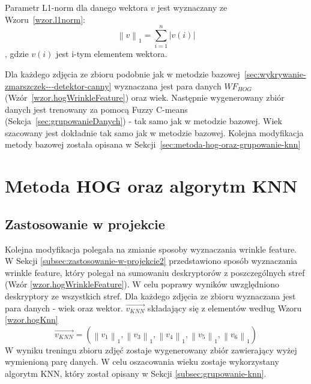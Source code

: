 \documentclass[a4paper,twoside,12pt]{book}
\begin{document}
    Parametr L1-norm dla danego wektora $v$ jest wyznaczany ze Wzoru~\ref{wzor.l1norm}:
    \large
    \begin{equation}
        \left \|v  \right \|_{1} = \sum_{i=1}^{n}\left |v(i)  \right |
        \label{wzor.l1norm}
    \end{equation}
    \normalsize
    , gdzie $v(i)$ jest i-tym elementem wektora.

    Dla każdego zdjęcia ze zbioru podobnie jak w metodzie bazowej~\ref{sec:wykrywanie-zmarszczek---detektor-canny}
    wyznaczana jest para danych $WF_{HOG}$ (Wzór~\ref{wzor.hogWrinkleFeature}) oraz wiek. Następnie wygenerowany
    zbiór danych jest trenowany za pomocą Fuzzy C-means (Sekcja~\ref{sec:grupowanieDanych}) - tak samo jak w metodzie
    bazowej.
    Wiek szacowany jest dokładnie tak samo jak w metodzie bazowej.
    Kolejna modyfikacja metody bazowej została opisana w Sekcji~\ref{sec:metoda-hog-oraz-grupowanie-knn}
    \section{Metoda HOG oraz algorytm KNN}\label{sec:metoda-hog-oraz-algorytm-knn}
    \subsection{Zastosowanie w projekcie}\label{subsec:zastosowanie-w-projekcie}
    Kolejna modyfikacja polegała na zmianie sposoby wyznaczania wrinkle feature.
    W Sekcji \ref{subsec:zastosowanie-w-projekcie2} przedstawiono sposób wyznaczania wrinkle feature,
    który polegał na sumowaniu deskryptorów z poszczególnych stref (Wzór \ref{wzor.hogWrinkleFeature}).
    W celu poprawy wyników uwzględniono deskryptory ze wszystkich stref.
    Dla każdego zdjęcia ze zbioru wyznaczana jest para danych - wiek oraz wektor.
    $\overrightarrow{v_{KNN}}$ składający się z elementów według Wzoru \ref{wzor.hogKnn}
    \large
    \begin{equation}
        \overrightarrow{v_{KNN}} = (\left \|v_{1}  \right \|_{1},\left \|v_{3}  \right \|_{1},\left \|v_{4}  \right
        \|_{1},\left \|v_{5}  \right \|_{1},\left \|v_{6}  \right \|_{1})
        \label{wzor.hogKnn}
    \end{equation}
    \normalsize
    W wyniku treningu zbioru zdjęć zostaje wygenerowany zbiór zawierający wyżej wymienioną parę danych.
    W celu oszacowania wieku zostaje wykorzystany algorytm KNN, który został opisany w
    Sekcji \ref{subsec:grupowanie-knn}.
\end{document}
